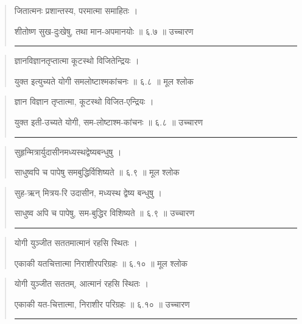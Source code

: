 \begin{quotation}

जितात्मनः प्रशान्तस्य, परमात्मा समाहितः  ।  

शीतोष्ण सुख-दुःखेषु, तथा मान-अपमानयोः  ॥ ६.७ ॥  उच्चारण

\noindent\rule{16cm}{0.4pt} 
\end{quotation}


\begin{quotation}  

ज्ञानविज्ञानतृप्तात्मा कूटस्थो विजितेन्द्रियः  ।  

युक्त इत्युच्यते योगी समलोष्टाश्मकांचनः  ॥ ६.८ ॥  मूल श्लोक
\end{quotation}

\begin{quotation}

ज्ञान विज्ञान तृप्तात्मा, कूटस्थो विजित-एन्द्रियः  ।  

युक्त इती-उच्यते योगी, सम-लोष्टाश्म-कांचनः  ॥ ६.८ ॥  उच्चारण

\noindent\rule{16cm}{0.4pt} 
\end{quotation}


\begin{quotation}  

सुहृन्मित्रार्युदासीनमध्यस्थद्वेष्यबन्धुषु  ।  

साधुष्वपि च पापेषु समबुद्धिर्विशिष्यते  ॥ ६.९ ॥  मूल श्लोक
\end{quotation}

\begin{quotation}

सुह-ऋन् मित्रय-रि उदासीन, मध्यस्थ द्वेष्य बन्धुषु  ।  

साधुष्व अपि च पापेषु, सम-बुद्धिर विशिष्यते  ॥ ६.९ ॥  उच्चारण

\noindent\rule{16cm}{0.4pt} 
\end{quotation}


\begin{quotation}  

योगी युञ्जीत सततमात्मानं रहसि स्थितः  ।  

एकाकी यतचित्तात्मा निराशीरपरिग्रहः  ॥ ६.१० ॥  मूल श्लोक
\end{quotation}

\begin{quotation}

योगी युञ्जीत सततम्, आत्मानं रहसि स्थितः  ।  

एकाकी यत-चित्तात्मा, निराशीर परिग्रहः  ॥ ६.१० ॥  उच्चारण

\noindent\rule{16cm}{0.4pt} 
\end{quotation}


